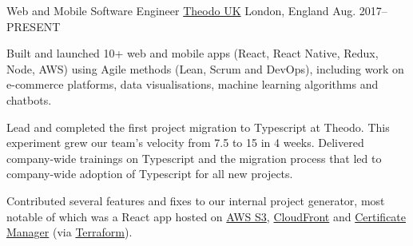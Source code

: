 

\begin{cventries}

  \cventry
    {Web and Mobile Software Engineer} %
    {\href{https://www.theodo.co.uk/}{Theodo UK}} %
    {London, England} %
    {Aug. 2017--\textsc{PRESENT}} %
    {
      \begin{cvitems} %
        \item Built and launched 10+ web and mobile apps (React, React Native, Redux, Node, AWS) using Agile methods (Lean, Scrum and DevOps), including work on e-commerce platforms, data visualisations, machine learning algorithms and chatbots.
        \item Lead and completed the first project migration to Typescript at Theodo. This experiment grew our team's velocity from 7.5 to 15 in 4 weeks. Delivered company-wide trainings on Typescript and the migration process that led to company-wide adoption of Typescript for all new projects.
        \item Contributed several features and fixes to our internal project generator, most notable of which was a React app hosted on \href{https://aws.amazon.com/s3/}{AWS S3}, \href{https://aws.amazon.com/cloudfront/}{CloudFront} and \href{https://aws.amazon.com/certificate-manager/}{Certificate Manager} (via \href{https://www.terraform.io/}{Terraform}).
      \end{cvitems}
    }
    {}


\end{cventries}
